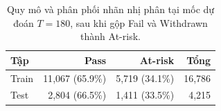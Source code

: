 \begin{table}[H]
  \centering
  \caption{Quy mô và phân phối nhãn nhị phân tại mốc dự đoán $T=180$, sau khi gộp Fail và Withdrawn thành At-risk.}
  \label{tab:split_t180}
  \begin{tabular}{lrrr}
    \toprule
    \textbf{Tập} & \textbf{Pass} & \textbf{At-risk} & \textbf{Tổng} \\
    \midrule
    Train & 11{,}067 (65.9\%) & 5{,}719 (34.1\%) & 16{,}786 \\
    Test  & 2{,}804 (66.5\%)  & 1{,}411 (33.5\%)  & 4{,}215  \\
    \bottomrule
  \end{tabular}
\end{table}
